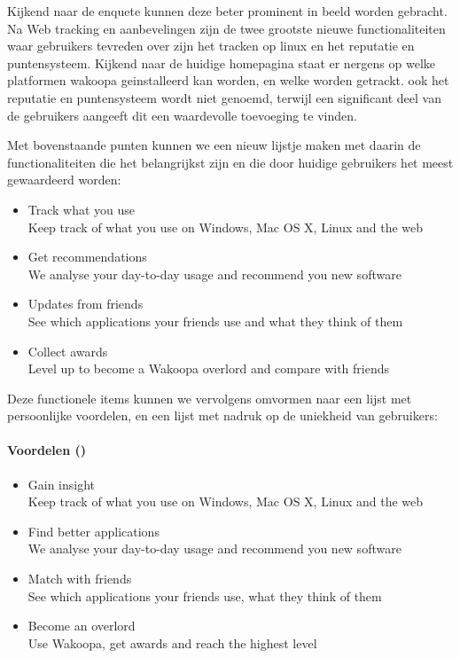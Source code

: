 Kijkend naar de enquete kunnen deze beter prominent in beeld worden gebracht. Na Web tracking en aanbevelingen zijn de twee grootste nieuwe functionaliteiten waar gebruikers tevreden over zijn het tracken op linux en het reputatie en puntensysteem. Kijkend naar de huidige homepagina staat er nergens op welke platformen wakoopa geinstalleerd kan worden, en welke worden getrackt. ook het reputatie en puntensysteem wordt niet genoemd, terwijl een significant deel van de gebruikers aangeeft dit een waardevolle toevoeging te vinden.

Met bovenstaande punten kunnen we een nieuw lijstje maken met daarin de functionaliteiten die het belangrijkst zijn en die door huidige gebruikers het meest gewaardeerd worden:
\begin{itemize}
    \item{Track what you use\\
      Keep track of what you use on Windows, Mac OS X, Linux and the web}

    \item{Get recommendations\\
      We analyse your day-to-day usage and recommend you new software}

    \item{Updates from friends\\
      See which applications your friends use and what they think of them}

    \item{Collect awards\\
      Level up to become a Wakoopa overlord and compare with friends}
\end{itemize}

Deze functionele items kunnen we vervolgens omvormen naar een lijst met persoonlijke voordelen, en een lijst met nadruk op de uniekheid van gebruikers:

\paragraph{Voordelen (\citet{Hoekman2008}) }
\begin{itemize}
    \item{Gain insight\\
      Keep track of what you use on Windows, Mac OS X, Linux and the web}

    \item{Find better applications\\
      We analyse your day-to-day usage and recommend you new software}

    \item{Match with friends\\
      See which applications your friends use, what they think of them}

    \item{Become an overlord\\
      Use Wakoopa, get awards and reach the highest level}
\end{itemize}
